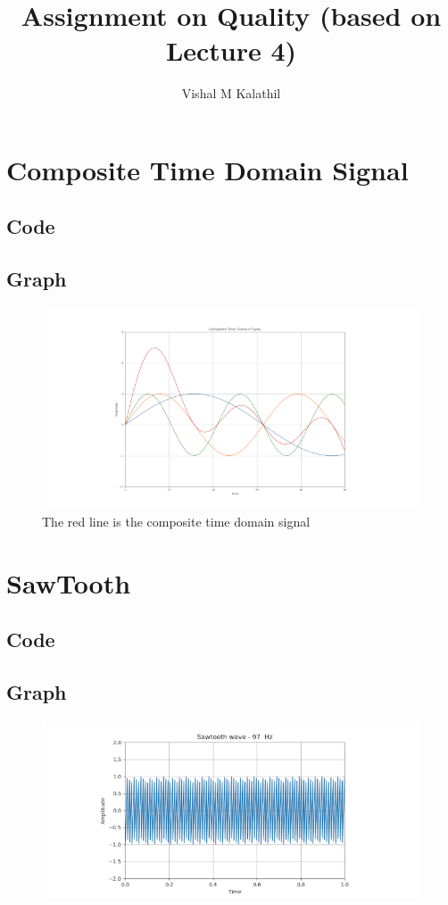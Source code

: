 \documentclass[11pt,a4paper]{article}
\title{Assignment on Quality (based on Lecture 4)}
\author{Vishal M Kalathil}
\begin{document}
\maketitle
\section{Composite Time Domain Signal} %
	\subsection{Code} %
	      
	    \newpage
	\subsection{Graph}%
	     \begin{figure}[hb]
	          \includegraphics{sine_waves.png}
	          \caption{The red line is the composite time domain signal}
	      \end{figure}
	      \newpage
\section{SawTooth} %
	\subsection{Code} %
	       
	\subsection{Graph}%
	     \begin{figure}[hb]
	          \includegraphics{sawtooth.png}
	      \end{figure} 
	      \newpage
\end{document}
